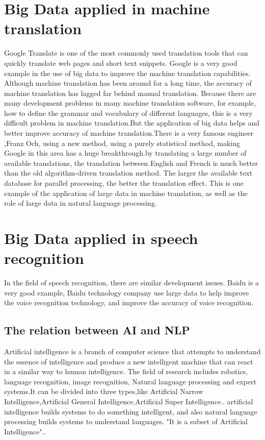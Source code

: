 \documentclass[sigconf]{acmart}
\begin{document}
\section{Big Data applied in machine translation}
Google Translate is one of the most commonly used translation tools that can quickly translate web pages and short text snippets. Google is a very good example in the use of big data to improve the machine translation capabilities. Although machine translation has been around for a long time, the accuracy of machine translation has lagged far behind manual translation. Because there are many development problems in many machine translation software, for example, how to define the grammar and vocabulary of different languages, this is a very difficult problem in machine translation.But the application of big data helps and better improve accuracy of machine translation.There is a very famous engineer ,Franz Och, using a new method, using a purely statistical method, making Google in this area has a huge breakthrough.by translating a large number of available translations, the translation between English and French is much better than the old algorithm-driven translation method. The larger the available text database for parallel processing, the better the translation effect. This is one example of the application of large data in machine translation, as well as the role of large data in natural language processing.

\section{Big Data applied in speech recognition}
In the field of speech recognition, there are similar development issues. Baidu is a very good example, Baidu technology company use large data to help improve the voice recognition technology, and improve the accuracy of voice recognition.

\subsection{The relation between AI and NLP}
Artificial intelligence is a branch of computer science that attempts to understand the essence of intelligence and produce a new intelligent machine that can react in a similar way to human intelligence. The field of research includes robotics, language recognition, image recognition, Natural language processing and expert systems.It can be divided into three types,like Artificial Narrow Intelligence,Artificial General Intelligence,Artificial Super Intelligence.\cite{Jagreet2017}. artificial intelligence builds systems to do something intelligent, and also natural language processing builds systems to understand languages. "It is a subset of Artificial Intelligence".\cite{Jagreet2017}.
\end{document}
